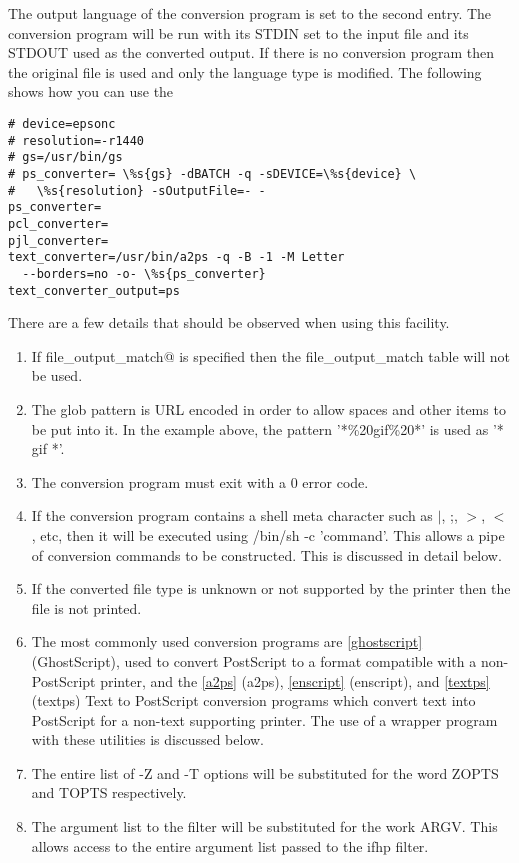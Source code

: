 \documentclass[a4paper]{article}
\begin{document}
The output language of the conversion program is set to the second entry.
The conversion program will be run with its STDIN set to the input file
and its STDOUT used as the converted output.
If there is no conversion program then the original file is used
and only the language type is modified.
The following shows how you can use the
\begin{tscreen}
\begin{verbatim}
# device=epsonc
# resolution=-r1440
# gs=/usr/bin/gs
# ps_converter= \%s{gs} -dBATCH -q -sDEVICE=\%s{device} \
#   \%s{resolution} -sOutputFile=- -
ps_converter=
pcl_converter=
pjl_converter=
text_converter=/usr/bin/a2ps -q -B -1 -M Letter
  --borders=no -o- \%s{ps_converter}
text_converter_output=ps
\end{verbatim}
\end{tscreen}

There are a few details that should be observed when using this facility.
\begin{enumerate}
\item If {\ttfamily file\_output\_match@} is specified
then the {\ttfamily file\_output\_match} table will not be used.
\item The glob pattern is URL encoded in order to allow spaces and other items
to be put into it.
In the example above,
the pattern {\ttfamily '*\%20gif\%20*'} is  used as {\ttfamily '* gif *'}.
\item The conversion program must exit with a 0 error code.
\item If the conversion program contains a shell meta character such as
{\ttfamily $|$},
{\ttfamily ;},
{\ttfamily $>$},
{\ttfamily $<$},
etc,
then it will be executed using
{\ttfamily /bin/sh -c 'command'}.
This allows a pipe of conversion commands to be constructed.
This is discussed in detail below.
\item If the converted file type is
{\ttfamily unknown} or not supported by the printer then the file is not printed. 
\item The most commonly used conversion programs are
\ref{ghostscript} {(GhostScript)},
used to convert PostScript to a format compatible with a non-PostScript
printer,
and the \ref{a2ps} {(a2ps)},
\ref{enscript} {(enscript)}, and \ref{textps} {(textps)}
Text to PostScript conversion programs which
convert text into PostScript for a non-text supporting printer.
The use of a {\ttfamily wrapper} program with these utilities is discussed below.
\item The entire list of -Z and -T options will be substituted for the word ZOPTS and TOPTS
respectively.
\item The argument list to the filter will be substituted for the work ARGV.
This allows access to the entire argument list passed to the {\ttfamily ifhp} filter.
\end{enumerate}
\end{document}
